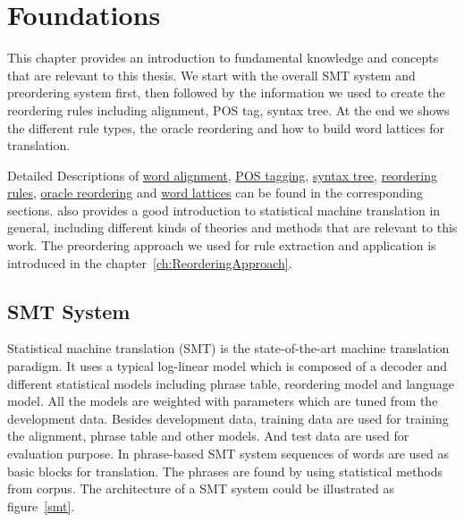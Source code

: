 
\chapter{Foundations}
\label{ch:Foundations}

This chapter provides an introduction to fundamental knowledge and concepts that are relevant to this thesis. We start with the overall SMT system and preordering system first, then followed by the information we used to create the reordering rules including alignment, POS tag, syntax tree. At the end we shows the different rule types, the oracle reordering and how to build word lattices for translation. 

Detailed Descriptions of \hyperref[ch:Foundations:sec:Alignment]{word alignment}, \hyperref[ch:Foundations:sec:PosTag]{POS tagging}, \hyperref[ch:Foundations:sec:SyntacticTree]{syntax tree},
\hyperref[ch:Foundations:sec:types]{reordering rules},
\hyperref[ch:Foundations:sec:oracle]{oracle reordering} and 
\hyperref[ch:Foundations:sec:Lattices]{word lattices} can be found in the corresponding sections. \cite{book} also provides a good introduction to statistical machine translation in general, including different kinds of theories and methods that are relevant to this work. The preordering approach we used for rule extraction and application is introduced in the chapter~\ref{ch:ReorderingApproach}.

\section{SMT System}
\label{ch:Foundations:sec:SMTSystem}

Statistical machine translation (SMT) is the state-of-the-art machine translation paradigm. It uses a typical log-linear model which is composed of a decoder and different statistical models including phrase table, reordering model and language model. All the models are weighted with parameters which are tuned from the development data. Besides development data, training data are used for training the alignment, phrase table and other models. And test data are used for evaluation purpose. In phrase-based SMT system sequences of words are used as basic blocks for translation. The phrases are found by using statistical methods from corpus. The architecture of a SMT system could be illustrated as figure~\ref{smt}.


